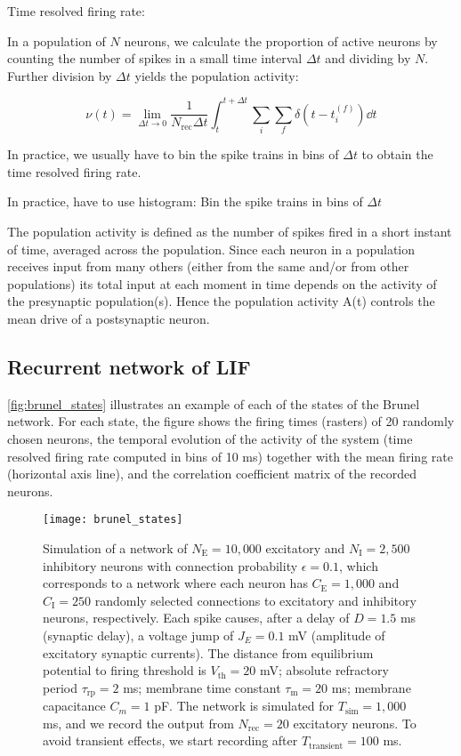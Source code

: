 Time resolved firing rate: 

In a population of $N$ neurons, we calculate the proportion of active neurons by counting the number of spikes in a small time interval $\Delta t$ and dividing by $N$. Further division by $\Delta t$ yields the population activity:

\begin{equation}
    \nu (t) = \lim_{\Delta t \to 0} \frac{1}{N_\mathrm{rec} \Delta t} \int_{t}^{t + \Delta t} \sum_i \sum_f \delta \left(t - t_i^{(f)} \right) \dd{t}
\end{equation} 

In practice, we usually have to bin the spike trains in bins of $\Delta t$ to obtain the time resolved firing rate. 

In practice, have to use histogram: Bin the spike trains in bins of $\Delta t$


The population activity is defined as the number of spikes fired in a short instant of time, averaged across the population. Since each neuron in a population receives input from many others (either from the same and/or from other populations) its total input at each moment in time depends on the activity of the presynaptic population(s). Hence the population activity A(t) controls the mean drive of a postsynaptic neuron.

\subsection{Recurrent network of LIF}


\autoref{fig:brunel_states} illustrates an example of each of the states of the Brunel network. For each state, the figure shows the firing times (rasters) of 20 randomly chosen neurons, the temporal evolution of the activity of the system (time resolved firing rate computed in bins of 10 ms) together with the mean firing rate (horizontal axis line), and the correlation coefficient matrix of the recorded neurons.


\begin{figure}[H]
    \centering
    \texttt{[image: brunel\_states]}
    \caption{Simulation of a network of $N_\mathrm{E}=10,000$ excitatory and $N_\mathrm{I} = 2,500$ inhibitory neurons with connection probability $\epsilon = 0.1$, which corresponds to a network where each neuron has $C_\mathrm{E}=1,000$ and $C_\mathrm{I}=250$ randomly selected connections to excitatory and inhibitory neurons, respectively. Each spike causes, after a delay of $D=1.5$ ms (synaptic delay), a voltage jump of $J_E = 0.1$ mV (amplitude of excitatory synaptic currents). The distance from equilibrium potential to firing threshold is $V_\mathrm{th} = 20$ mV; absolute refractory period $\tau_\mathrm{rp} = 2$ ms; membrane time constant $\tau_\mathrm{m}=20$ ms; membrane capacitance $C_m = 1$ pF. The network is simulated for $T_\mathrm{sim} = 1,000$ ms, and we record the output from $N_\mathrm{rec} = 20$ excitatory neurons. To avoid transient effects, we start recording after $T_\mathrm{transient} = 100$ ms. 
    }
    \label{fig:brunel_states}
\end{figure}


